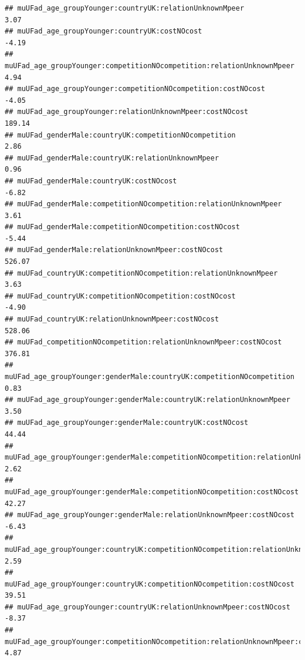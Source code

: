 \documentclass[
]{article}
\begin{document}
\begin{verbatim}
## muUFad_age_groupYounger:countryUK:relationUnknownMpeer                                           3.07
## muUFad_age_groupYounger:countryUK:costNOcost                                                    -4.19
## muUFad_age_groupYounger:competitionNOcompetition:relationUnknownMpeer                            4.94
## muUFad_age_groupYounger:competitionNOcompetition:costNOcost                                     -4.05
## muUFad_age_groupYounger:relationUnknownMpeer:costNOcost                                        189.14
## muUFad_genderMale:countryUK:competitionNOcompetition                                             2.86
## muUFad_genderMale:countryUK:relationUnknownMpeer                                                 0.96
## muUFad_genderMale:countryUK:costNOcost                                                          -6.82
## muUFad_genderMale:competitionNOcompetition:relationUnknownMpeer                                  3.61
## muUFad_genderMale:competitionNOcompetition:costNOcost                                           -5.44
## muUFad_genderMale:relationUnknownMpeer:costNOcost                                              526.07
## muUFad_countryUK:competitionNOcompetition:relationUnknownMpeer                                   3.63
## muUFad_countryUK:competitionNOcompetition:costNOcost                                            -4.90
## muUFad_countryUK:relationUnknownMpeer:costNOcost                                               528.06
## muUFad_competitionNOcompetition:relationUnknownMpeer:costNOcost                                376.81
## muUFad_age_groupYounger:genderMale:countryUK:competitionNOcompetition                            0.83
## muUFad_age_groupYounger:genderMale:countryUK:relationUnknownMpeer                                3.50
## muUFad_age_groupYounger:genderMale:countryUK:costNOcost                                         44.44
## muUFad_age_groupYounger:genderMale:competitionNOcompetition:relationUnknownMpeer                 2.62
## muUFad_age_groupYounger:genderMale:competitionNOcompetition:costNOcost                          42.27
## muUFad_age_groupYounger:genderMale:relationUnknownMpeer:costNOcost                              -6.43
## muUFad_age_groupYounger:countryUK:competitionNOcompetition:relationUnknownMpeer                  2.59
## muUFad_age_groupYounger:countryUK:competitionNOcompetition:costNOcost                           39.51
## muUFad_age_groupYounger:countryUK:relationUnknownMpeer:costNOcost                               -8.37
## muUFad_age_groupYounger:competitionNOcompetition:relationUnknownMpeer:costNOcost                 4.87

\end{verbatim}
\end{document}
